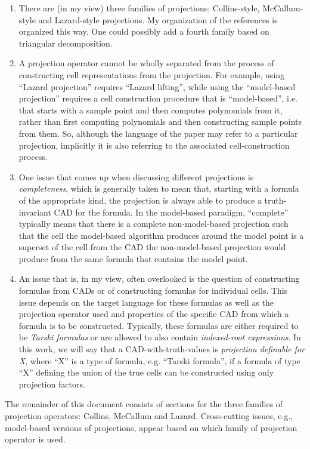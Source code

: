 \documentclass{article}
\begin{document}
\begin{enumerate}
\item There are (in my view) three families of projections:
  Collins-style, McCallum-style and Lazard-style projections.  My
  organization of the references is organized this way.
  One could possibly add a fourth family based on triangular
  decomposition. 
\item A projection operator cannot be wholly separated from the process of
  constructing cell representations from the projection.  For
  example, using ``Lazard projection'' requires ``Lazard lifting'',
  while using the ``model-based projection'' requires a cell
  construction procedure that is ``model-based'', i.e. that starts with a
  sample point and then computes polynomials from it, rather than
  first computing polynomials and then constructing sample points from
  them. So, although the language of the paper may refer to a
  particular projection, implicitly it is also referring to the
  associated cell-construction process.
\item One issue that comes up when discussing different projections is
  \emph{completeness}, which is generally taken to mean that,
  starting with a formula of the appropriate kind, the projection
  is always able to produce a truth-invariant CAD for the formula.
  In the model-based paradigm, ``complete'' typically
  means that there is a complete non-model-based projection such that 
  the cell the model-based algorithm produces around the model point is a superset of the
  cell from the CAD the non-model-based projection would produce from
  the same formula that contains the model point.
\item An issue that is, in my view, often overlooked is the question
  of constructing formulas from CADs or of constructing formulas for 
  individual cells.  This issue depends on the target language for
  these formulas as well as the projection operator used and
  properties of the specific CAD from which a formula is to be
  constructed.  Typically, these formulas are either required to
  be \emph{Tarski formulas} or are allowed to also contain
  \emph{indexed-root expressions}.  In this work, we will say that
  a CAD-with-truth-values is \emph{projection definable for X}, where ``X'' is a type
  of formula, e.g. ``Tarski formula'', if a formula of type ``X'' defining the union
  of the true cells can be constructed using only projection factors.
\end{enumerate}

The remainder of this document consists of sections for the three
families of projection operators: Collins, McCallum and Lazard.
Cross-cutting issues, e.g., model-based versions of projections,
appear based on which family of projection operator is used.
\end{document}

